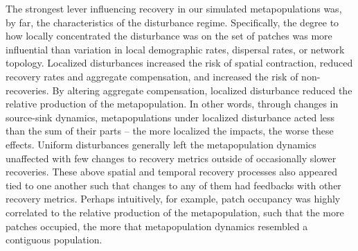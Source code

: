 \documentclass[
]{article}
\begin{document}
The strongest lever influencing recovery in our simulated
metapopulations was, by far, the characteristics of the disturbance
regime. Specifically, the degree to how locally concentrated the
disturbance was on the set of patches was more influential than
variation in local demographic rates, dispersal rates, or network
topology. Localized disturbances increased the risk of spatial
contraction, reduced recovery rates and aggregate compensation, and
increased the risk of non-recoveries. By altering aggregate
compensation, localized disturbance reduced the relative production of
the metapopulation. In other words, through changes in source-sink
dynamics, metapopulations under localized disturbance acted less than
the sum of their parts -- the more localized the impacts, the worse
these effects. Uniform disturbances generally left the metapopulation
dynamics unaffected with few changes to recovery metrics outside of
occasionally slower recoveries. These above spatial and temporal
recovery processes also appeared tied to one another such that changes
to any of them had feedbacks with other recovery metrics. Perhaps
intuitively, for example, patch occupancy was highly correlated to the
relative production of the metapopulation, such that the more patches
occupied, the more that metapopulation dynamics resembled a contiguous
population.
\end{document}
